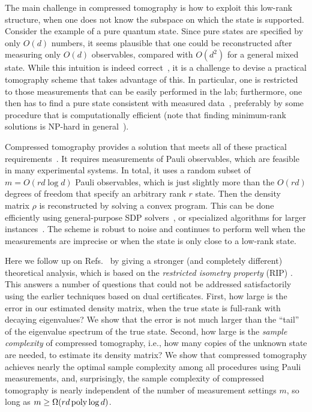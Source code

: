 The main challenge in compressed tomography is how to exploit this low-rank structure, 
when one does not know the subspace on which the state is supported. 
Consider the example of a pure quantum state. Since pure states are
specified by only $O(d)$ numbers, it seems plausible that one could be
reconstructed after measuring only $O(d)$ observables, compared with
$O(d^2)$ for a general mixed state.  While this intuition is indeed
correct~\cite{Amiet1999, Flammia2005, Merkel2010, Heinosaari2011}, it is a challenge to devise a
practical tomography scheme that takes advantage of this. In
particular, one is restricted to those measurements that can be easily
performed in the lab; furthermore, one then has to find a pure state
consistent with measured data~\cite{Kaznady2009}, preferably by some
procedure that is computationally efficient (note that finding
minimum-rank solutions is NP-hard in general~\cite{Natarajan1995}).

Compressed tomography provides a solution that meets all of these
practical requirements~\cite{Gross2010,Gross2011}.  It requires
measurements of Pauli observables, which are feasible in many
experimental systems.  In total, it uses a random subset of $m =
O(rd\log d)$ Pauli observables, which is
just slightly more than the $O(rd)$ degrees of freedom that specify an
arbitrary rank $r$ state.  Then the density matrix $\rho$ is
reconstructed by solving a convex program.
This can be done efficiently using general-purpose SDP
solvers~\cite{Sturm1999}, or specialized algorithms for larger
instances~\cite{Cai2010, Becker2010, Ma2011}. The scheme is robust to noise and continues to perform well when the measurements are imprecise or when the state is only close to a low-rank state.  

Here we follow up on Refs.~\cite{Gross2010,Gross2011} by giving a stronger (and completely different) theoretical analysis, which is based on the \textit{restricted isometry property} (RIP) \cite{Liu2011, Candes2011, Recht2007}.  This answers a number of questions that could not be addressed satisfactorily using the earlier techniques based on dual certificates.  First, how large is the error in our estimated density matrix, when the true state is full-rank with decaying eigenvalues? We show that the error is not much larger than the ``tail'' of the eigenvalue spectrum of the true state. Second, how large is the \textit{sample complexity} of compressed tomography, i.e., how many copies of the unknown state are needed, to estimate its density matrix?  We show that compressed tomography achieves nearly the optimal sample complexity among all procedures using Pauli measurements, and, surprisingly, the sample complexity of compressed tomography is nearly independent of the number of measurement settings $m$, so long as $m \geq \Omega(rd \operatorname{poly}\log d)$.

